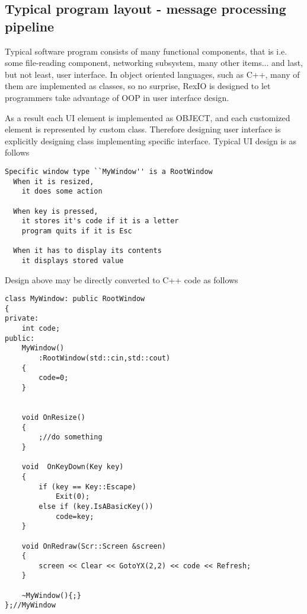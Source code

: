 \subsection {Typical program layout - message processing pipeline}
Typical software program consists of many functional components, that
is i.e. some file-reading component, networking subsystem, many other
items... and last, but not least, user interface. In object oriented
languages, such as C++, many of them are implemented as classes, so no
surprise, RexIO is designed to let programmers take advantage of OOP
in user interface design. 

As a result each UI element is implemented as OBJECT, and each
customized element is represented by custom class. Therefore designing
user interface is explicitly designing class implementing specific
interface. Typical UI design is as follows

{\footnotesize\begin{verbatim}
Specific window type ``MyWindow'' is a RootWindow
  When it is resized, 
    it does some action

  When key is pressed, 
    it stores it's code if it is a letter
    program quits if it is Esc

  When it has to display its contents
    it displays stored value
\end{verbatim}}

Design above may be directly converted to C++ code as follows

\begin{lstlisting}
class MyWindow: public RootWindow
{
private:
	int code;
public:
	MyWindow()
		:RootWindow(std::cin,std::cout)
	{
		code=0;
	}


	void OnResize()
	{
		;//do something
	}

	void  OnKeyDown(Key key)
	{
		if (key == Key::Escape)
			Exit(0);
		else if (key.IsABasicKey())
			code=key;
	}

	void OnRedraw(Scr::Screen &screen)
	{
		screen << Clear << GotoYX(2,2) << code << Refresh;
	}

	~MyWindow(){;}
};//MyWindow
\end{lstlisting}

